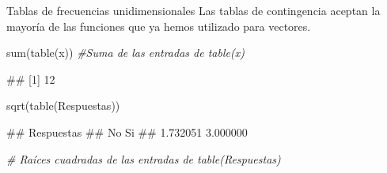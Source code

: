 \documentclass[
  ignorenonframetext,
  aspectratio=169]{beamer}
\newenvironment{Shaded}{\begin{snugshade}}{\end{snugshade}}
\newcommand{\CommentTok}[1]{\textcolor[rgb]{0.56,0.35,0.01}{\textit{#1}}}
\newcommand{\FunctionTok}[1]{\textcolor[rgb]{0.00,0.00,0.00}{#1}}
\newcommand{\NormalTok}[1]{#1}
\let\oldverbatim\verbatim
\let\endoldverbatim\endverbatim
\renewenvironment{verbatim}{\tiny\oldverbatim}{\endoldverbatim}
\begin{document}
\begin{frame}[fragile]{Tablas de frecuencias unidimensionales}
\protect\hypertarget{tablas-de-frecuencias-unidimensionales-7}{}
Las tablas de contingencia aceptan la mayoría de las funciones que ya
hemos utilizado para vectores.

\begin{Shaded}
\begin{Highlighting}[]
\FunctionTok{sum}\NormalTok{(}\FunctionTok{table}\NormalTok{(x)) }\CommentTok{\#Suma de las entradas de table(x)}
\end{Highlighting}
\end{Shaded}

\begin{verbatim}
## [1] 12
\end{verbatim}

\begin{Shaded}
\begin{Highlighting}[]
\FunctionTok{sqrt}\NormalTok{(}\FunctionTok{table}\NormalTok{(Respuestas))}
\end{Highlighting}
\end{Shaded}

\begin{verbatim}
## Respuestas
##       No       Si 
## 1.732051 3.000000
\end{verbatim}

\begin{Shaded}
\begin{Highlighting}[]
\CommentTok{\# Raíces cuadradas de las entradas de table(Respuestas)}
\end{Highlighting}
\end{Shaded}
\end{frame}
\end{document}
